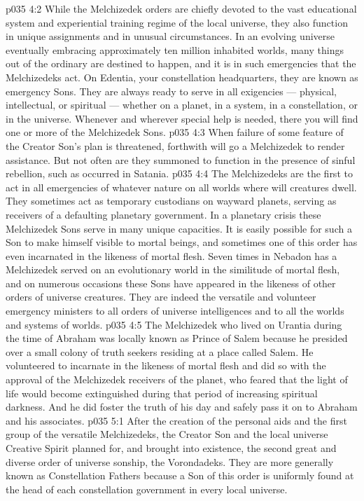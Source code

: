 \vs p035 4:2 \pc While the Melchizedek orders are chiefly devoted to the vast educational system and experiential training regime of the local universe, they also function in unique assignments and in unusual circumstances. In an evolving universe eventually embracing approximately ten million inhabited worlds, many things out of the ordinary are destined to happen, and it is in such emergencies that the Melchizedeks act. On Edentia, your constellation headquarters, they are known as emergency Sons. They are always ready to serve in all exigencies --- physical, intellectual, or spiritual --- whether on a planet, in a system, in a constellation, or in the universe. Whenever and wherever special help is needed, there you will find one or more of the Melchizedek Sons.
\vs p035 4:3 When failure of some feature of the Creator Son’s plan is threatened, forthwith will go a Melchizedek to render assistance. But not often are they summoned to function in the presence of sinful rebellion, such as occurred in Satania.
\vs p035 4:4 The Melchizedeks are the first to act in all emergencies of whatever nature on all worlds where will creatures dwell. They sometimes act as temporary custodians on wayward planets, serving as receivers of a defaulting planetary government. In a planetary crisis these Melchizedek Sons serve in many unique capacities. It is easily possible for such a Son to make himself visible to mortal beings, and sometimes one of this order has even incarnated in the likeness of mortal flesh. Seven times in Nebadon has a Melchizedek served on an evolutionary world in the similitude of mortal flesh, and on numerous occasions these Sons have appeared in the likeness of other orders of universe creatures. They are indeed the versatile and volunteer emergency ministers to all orders of universe intelligences and to all the worlds and systems of worlds.
\vs p035 4:5 \pc The Melchizedek who lived on Urantia during the time of Abraham was locally known as Prince of Salem because he presided over a small colony of truth seekers residing at a place called Salem. He volunteered to incarnate in the likeness of mortal flesh and did so with the approval of the Melchizedek receivers of the planet, who feared that the light of life would become extinguished during that period of increasing spiritual darkness. And he did foster the truth of his day and safely pass it on to Abraham and his associates.
\vs p035 5:1 After the creation of the personal aids and the first group of the versatile Melchizedeks, the Creator Son and the local universe Creative Spirit planned for, and brought into existence, the second great and diverse order of universe sonship, the Vorondadeks. They are more generally known as Constellation Fathers because a Son of this order is uniformly found at the head of each constellation government in every local universe.
